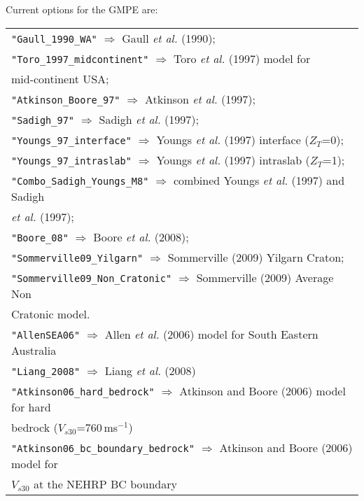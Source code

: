 Current options for the GMPE are: \\
\vspace{1em}
\begin{tabular}{|p{\textwidth}|}
\hline
\texttt{"Gaull\_1990\_WA"} $\Rightarrow$ Gaull \textit{et al.} (1990); \\
\texttt{"Toro\_1997\_midcontinent"}  $\Rightarrow$ Toro \textit{et al.} (1997) model for \\
    \hspace{8em} mid-continent USA; \\
\texttt{"Atkinson\_Boore\_97"}  $\Rightarrow$ Atkinson \textit{et al.} (1997); \\
\texttt{"Sadigh\_97"}  $\Rightarrow$ Sadigh \textit{et al.} (1997); \\
\texttt{"Youngs\_97\_interface"}  $\Rightarrow$ Youngs \textit{et al.} (1997) interface ($Z_T$=0); \\
\texttt{"Youngs\_97\_intraslab"}  $\Rightarrow$ Youngs \textit{et al.} (1997) intraslab ($Z_T$=1); \\
\texttt{"Combo\_Sadigh\_Youngs\_M8"}  $\Rightarrow$ combined Youngs \textit{et al.} (1997) and Sadigh \\
    \hspace{8em} \textit{et al.} (1997); \\
\texttt{"Boore\_08"}  $\Rightarrow$ Boore \textit{et al.} (2008); \\
\texttt{"Sommerville09\_Yilgarn"} $\Rightarrow$ Sommerville (2009) Yilgarn Craton; \\
\texttt{"Sommerville09\_Non\_Cratonic"} $\Rightarrow$ Sommerville (2009) Average Non \\
    \hspace{8em} Cratonic model. \\
\texttt{"AllenSEA06"} $\Rightarrow$ Allen \textit{et al.} (2006) model for South Eastern Australia \\
\texttt{"Liang\_2008"} $\Rightarrow$ Liang \textit{et al.} (2008) \\
\texttt{"Atkinson06\_hard\_bedrock"} $\Rightarrow$ Atkinson and Boore (2006) model for hard \\
    \hspace{8em} bedrock ($V_{s30}$=760\,ms$^{-1}$)\\
\texttt{"Atkinson06\_bc\_boundary\_bedrock"} $\Rightarrow$ Atkinson and Boore (2006) model for \\
\hspace{8em} $V_{s30}$ at the NEHRP BC boundary\\

\end{tabular}
